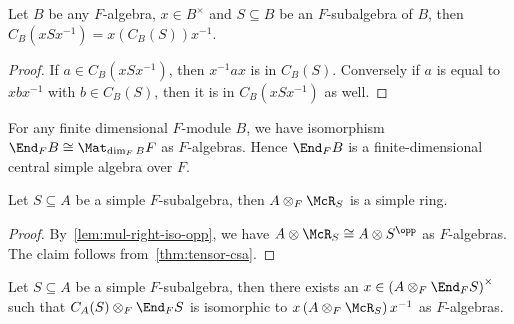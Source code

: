  \begin{lemma}
   \label{lem:centralizer-conj}
   Let $B$ be any $F$-algebra, $x \in B^{\times}$ and $S\subseteq B$ be an
   $F$-subalgebra of $B$, then $C_{B}(xSx^{-1})=x\left(C_{B}(S)\right)x^{-1}$.
   \leanok
 \end{lemma}
 \begin{proof}
   If $a \in C_{B}\left(xSx^{-1}\right)$, then $x^{-1}ax$ is in $C_{B}(S)$.
   Conversely if $a$ is equal to $xbx^{-1}$ with $b\in C_{B}(S)$, then it is in
   $C_{B}\left(xSx^{-1}\right)$ as well.
 \end{proof}

 \begin{remark}
   For any finite dimensional $F$-module $B$, we have isomorphism
   $\End_{F}B \cong \Mat_{\dim_{F}B}F$ as $F$-algebras. Hence $\End_{F} B$ is a
   finite-dimensional central simple algebra over $F$.
 \end{remark}

 \begin{lemma}\label{lem:tensor-mul-right-simple}
   Let $S\subseteq A$ be a simple $F$-subalgebra, then
   $A \otimes_{F} \McR_{S}$ is a simple ring.
   \leanok
 \end{lemma}

 \begin{proof}
   By~\cref{lem:mul-right-iso-opp}, we have
   $A\otimes \McR_{S}\cong A\otimes S^{\opp}$ as $F$-algebras. The claim follows
   from~\cref{thm:tensor-csa}.
 \end{proof}

 \begin{lemma}\label{lem:centralizer-tensor-end-eq-conj-tensor-mul-right}
   Let $S\subseteq A$ be a simple $F$-subalgebra, then there
   exists an $x\in \left(A\otimes_{F}\End_{F}S\right)^{\times}$ such that
   $C_{A}(S)\otimes_{F}\End_{F}S$ is isomorphic to
   $x\left(A\otimes_{F}\McR_{S}\right)x^{-1}$ as $F$-algebras.
   \leanok
 \end{lemma}

